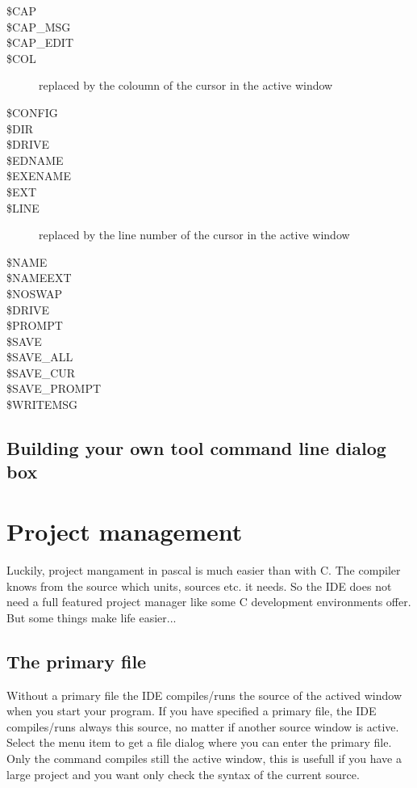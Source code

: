 \begin{description}
\item[\$CAP]
\item[\$CAP\_MSG]
\item[\$CAP\_EDIT]
\item[\$COL] replaced by the coloumn of the cursor in the active window
\item[\$CONFIG]
\item[\$DIR]
\item[\$DRIVE]
\item[\$EDNAME]
\item[\$EXENAME]
\item[\$EXT]
\item[\$LINE] replaced by the line number of the cursor in the active window
\item[\$NAME]
\item[\$NAMEEXT]
\item[\$NOSWAP]
\item[\$DRIVE]
\item[\$PROMPT]
\item[\$SAVE]
\item[\$SAVE\_ALL]
\item[\$SAVE\_CUR]
\item[\$SAVE\_PROMPT]
\item[\$WRITEMSG]
\end{description}

\subsection{Building your own tool command line dialog box}

\section{Project management}
\label{se:projectmanagement}
Luckily, project mangament in pascal is much easier than with C. The
compiler knows from the source which units, sources etc. it needs.
So the \fpc IDE does not need a full featured project manager like
some C development environments offer. But some things make life easier...

\subsection{The primary file}
\label{se:primaryfile}
Without a primary file the IDE compiles/runs the source of the actived
window when you start your program. If you have specified a primary
file, the IDE compiles/runs always this source, no matter if another
source window is active. Select the menu item 
to get a file dialog where you can enter the primary file. Only the command
 compiles still the active window, this is usefull
if you have a large project and you want only check the syntax of the
current source.

